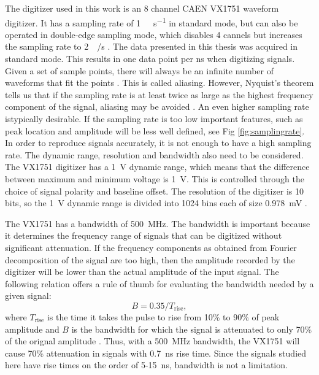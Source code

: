 \documentclass[main.tex]{subfiles}
\begin{document}
The digitizer used in this work is an 8 channel CAEN VX1751 waveform digitizer. It has a sampling rate of \si{1\giga\sample\per\second} in standard mode, but can also be operated in double-edge sampling mode, which disables 4 cannels but increases the sampling rate to \SI{2}{\giga\sample/\second} \cite{CAEN}. The data presented in this thesis was acquired in standard mode. This results in one data point per ns when digitizing signals. Given a set of sample points, there will always be an infinite number of waveforms that fit the points \cite{Spectrum}. This is called aliasing. However, Nyquist's theorem tells us that if the sampling rate is at least twice as large as the highest frequency component of the signal, aliasing may be avoided \cite{Spectrum}. An even higher sampling rate istypically desirable. If the sampling rate is too low important features, such as peak location and amplitude will be less well defined, see Fig \ref{fig:samplingrate}.
In order to reproduce signals accurately, it is not enough to have a high sampling rate. The dynamic range, resolution and bandwidth also need to be considered. 
The VX1751 digitizer has a \SI{1}{\volt} dynamic range, which means that the difference between maximum and minimum voltage is \SI{1}{\volt}. This is controlled through the choice of signal polarity and baseline offset. The resolution of the digitizer is 10 bits, so the \si{1\volt} dynamic range is divided into 1024 bins each of size \SI{0.978}{\milli\volt} \cite{CAEN}.

The VX1751 has a bandwidth of \SI{500}{\mega\hertz}. The bandwidth is important because it determines the frequency range of signals that can be digitized without significant attenuation. If the frequency components as obtained from Fourier decomposition of the signal are too high, then the amplitude recorded by the digitizer will be lower than the actual amplitude of the input signal. The following relation offers a rule of thumb for evaluating the bandwidth needed by a given signal:
\begin{equation}
\label{eq:bandwidth}
B=0.35/T_{\textrm{rise}},
\end{equation}
where $T_\textrm{rise}$ is the time it takes the pulse to rise from 10\% to 90\% of peak amplitude and $B$ is the bandwidth for which the signal is attenuated to only 70\% of the orignal amplitude \cite{Leo}. Thus, with a \SI{500}{MHz} bandwidth, the VX1751 will cause 70\% attenuation in signals with \SI{0.7}{ns} rise time. Since the signals studied here have rise times on the order of 5-\SI{15}{ns}, bandwidth is not a limitation.
\end{document}
